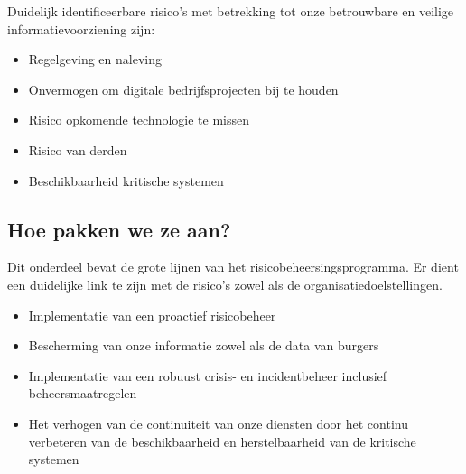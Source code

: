 \documentclass[11pt]{article}
\begin{document}
Duidelijk identificeerbare risico's met betrekking tot onze betrouwbare en veilige informatievoorziening zijn:
\begin{itemize}
\item Regelgeving en naleving
\item Onvermogen om digitale bedrijfsprojecten bij te houden
\item Risico opkomende technologie te missen
\item Risico van derden
\item Beschikbaarheid kritische systemen
\end{itemize}

\subsection{Hoe pakken we ze aan?}
\label{sec:org390ee95}
Dit onderdeel bevat de grote lijnen van het risicobeheersingsprogramma. Er dient een duidelijke link te zijn met de risico's zowel als de organisatiedoelstellingen.
\begin{itemize}
\item Implementatie van een proactief risicobeheer
\item Bescherming van onze informatie zowel als de data van burgers
\item Implementatie van een robuust crisis- en incidentbeheer inclusief beheersmaatregelen
\item Het verhogen van de continuiteit van onze diensten door het continu verbeteren van de beschikbaarheid en herstelbaarheid van de kritische systemen
\end{itemize}
\end{document}
